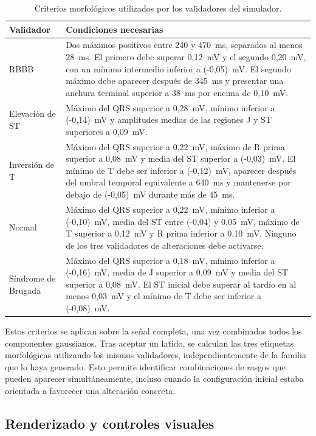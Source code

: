 \begin{table}[H]
\centering
\scriptsize
\begin{tabularx}{\textwidth}{p{2.25cm} X}
\toprule
\textbf{Validador} & \textbf{Condiciones necesarias} \\
\midrule
RBBB &
Dos máximos positivos entre 240 y 470~ms, separados al menos 28~ms. El primero debe superar 0,12~mV y el segundo 0,20~mV, con un mínimo intermedio inferior a (-0,05)~mV. El segundo máximo debe aparecer después de 345~ms y presentar una anchura terminal superior a 38~ms por encima de 0,10~mV. \\
Elevación de ST &
Máximo del QRS superior a 0,28~mV, mínimo inferior a (-0,14)~mV y amplitudes medias de las regiones J y ST superiores a 0,09~mV. \\
Inversión de T &
Máximo del QRS superior a 0,22~mV, máximo de R prima superior a 0,08~mV y media del ST superior a (-0,03)~mV. El mínimo de T debe ser inferior a (-0,12)~mV, aparecer después del umbral temporal equivalente a 640~ms y mantenerse por debajo de (-0,05)~mV durante más de 45~ms. \\
Normal &
Máximo del QRS superior a 0,22~mV, mínimo inferior a (-0,10)~mV, media del ST entre (-0,04) y 0,05~mV, máximo de T superior a 0,12~mV y R prima inferior a 0,10~mV. Ninguno de los tres validadores de alteraciones debe activarse. \\
Síndrome de Brugada &
Máximo del QRS superior a 0,18~mV, mínimo inferior a (-0,16)~mV, media de J superior a 0,09~mV y media del ST superior a 0,08~mV. El ST inicial debe superar al tardío en al menos 0,03~mV y el mínimo de T debe ser inferior a (-0,08)~mV. \\
\bottomrule
\end{tabularx}
\caption{Criterios morfológicos utilizados por los validadores del simulador.}
\label{tab:validadores}
\end{table}

Estos criterios se aplican sobre la señal completa, una vez combinados todos los componentes gaussianos. Tras aceptar un latido, se calculan las tres etiquetas morfológicas utilizando los mismos validadores, independientemente de la familia que lo haya generado. Esto permite identificar combinaciones de rasgos que pueden aparecer simultáneamente, incluso cuando la configuración inicial estaba orientada a favorecer una alteración concreta.

\clearpage
\subsection{Renderizado y controles visuales}

